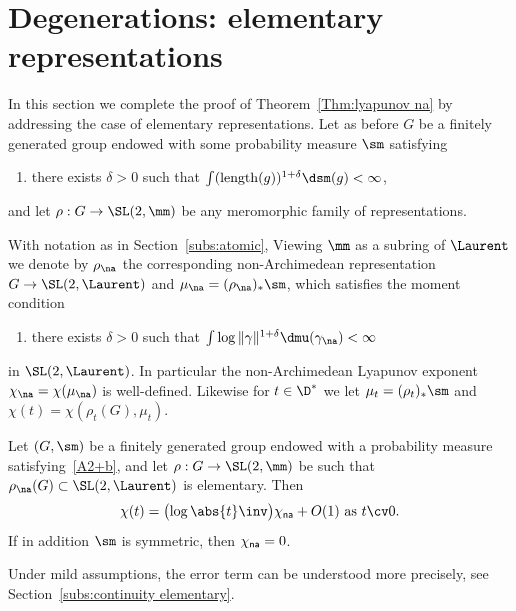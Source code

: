 \section{Degenerations: elementary representations}\label{sec:elem}

In this section we complete the proof of Theorem~\ref{Thm:lyapunov na} by addressing the case of elementary representations. Let as before $G$ be a finitely generated group endowed with some probability measure $\sm$ satisfying
\begin{enumerate}\renewcommand*{\theenumi}{A\arabic{enumi}${}^+$}\setcounter{enumi}{1}
\item \label{A2+b} there exists $\delta>0$ such that $\int (\mathrm{length}(g))^{1+\delta} \dsm(g)<\infty$,
\end{enumerate}
and let $\rho :G\to \SL(2, \mm)$ be any meromorphic family of representations.

With notation as in Section~\ref{subs:atomic}, Viewing $\mm$ as a subring of $\Laurent$ we denote by $\rho_\na$ the corresponding non-Archimedean representation $G\to \SL(2, \Laurent)$ and $\mu_\na = (\rho_\na)_* \sm$, which satisfies the moment condition
\begin{enumerate}\renewcommand*{\theenumi}{B\arabic{enumi}${}^+$}\setcounter{enumi}{1}
\item \label{B2+b} there exists $\delta>0$ such that $\int \log \|\gamma\|^{1+\delta} \dmu(\gamma_\na)<\infty$
\end{enumerate}
in $\SL(2, \Laurent)$. In particular the non-Archimedean Lyapunov exponent $\chi_\na = \chi(\mu_\na)$ is well-defined. Likewise for $t\in \D^*$ we let $\mu_t = (\rho_t)_* \sm$ and $\chi(t) = \chi(\rho_t(G), \mu_t)$.

\begin{theo} \label{thm:degeneration elementary}
Let $(G, \sm)$ be a finitely generated group endowed with a probability measure satisfying~\eqref{A2+b}, and let $\rho: G\to \SL(2, \mm)$ be such that $ \rho_\na(G) \subset \SL(2,\Laurent)$ is elementary. Then
\begin{equation}\label{eq:lyapunov elementary}
\chi(t) = \big({\log\abs{t}\inv} \big) \chi_{\sf na} + O(1) \text{ as } t\cv 0.
\end{equation}
If in addition $\sm$ is symmetric, then $\chi_{\sf na} = 0$.
\end{theo}

Under mild assumptions, the error term can be understood more precisely, see Section~\ref{subs:continuity elementary}.


